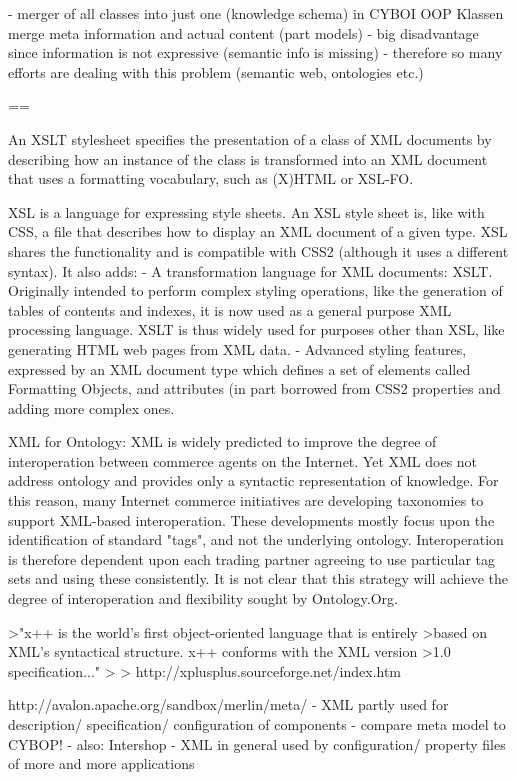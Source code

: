 - merger of all classes into just one (knowledge schema) in CYBOI
OOP Klassen merge meta information and actual content (part models)
- big disadvantage since information is not expressive (semantic info is missing)
- therefore so many efforts are dealing with this problem (semantic web, ontologies etc.)

==

\cite{w3c}
An XSLT stylesheet specifies the presentation of a class of XML documents by
describing how an instance of the class is transformed into an XML document
that uses a formatting vocabulary, such as (X)HTML or XSL-FO.

XSL is a language for expressing style sheets. An XSL style sheet is, like
with CSS, a file that describes how to display an XML document of a given type.
XSL shares the functionality and is compatible with CSS2 (although it uses a
different syntax). It also adds:
- A transformation language for XML documents: XSLT. Originally intended to
perform complex styling operations, like the generation of tables of contents
and indexes, it is now used as a general purpose XML processing language.
XSLT is thus widely used for purposes other than XSL, like generating HTML web
pages from XML data.
- Advanced styling features, expressed by an XML document type which defines a
set of elements called Formatting Objects, and attributes (in part borrowed from
CSS2 properties and adding more complex ones.

XML for Ontology:
XML is widely predicted to improve the degree of interoperation between commerce
agents on the Internet. Yet XML does not address ontology and provides only a
syntactic representation of knowledge. For this reason, many Internet commerce
initiatives are developing taxonomies to support XML-based interoperation.
These developments mostly focus upon the identification of standard "tags",
and not the underlying ontology. Interoperation is therefore dependent upon
each trading partner agreeing to use particular tag sets and using these
consistently. It is not clear that this strategy will achieve the degree of
interoperation and flexibility sought by Ontology.Org.

>"x++ is the world's first object-oriented language that is entirely
>based on XML's syntactical structure. x++ conforms with the XML version
>1.0 specification..."
>
>  http://xplusplus.sourceforge.net/index.htm

http://avalon.apache.org/sandbox/merlin/meta/
- XML partly used for description/ specification/ configuration of components
- compare meta model to CYBOP!
- also: Intershop
- XML in general used by configuration/ property files of more and more applications


